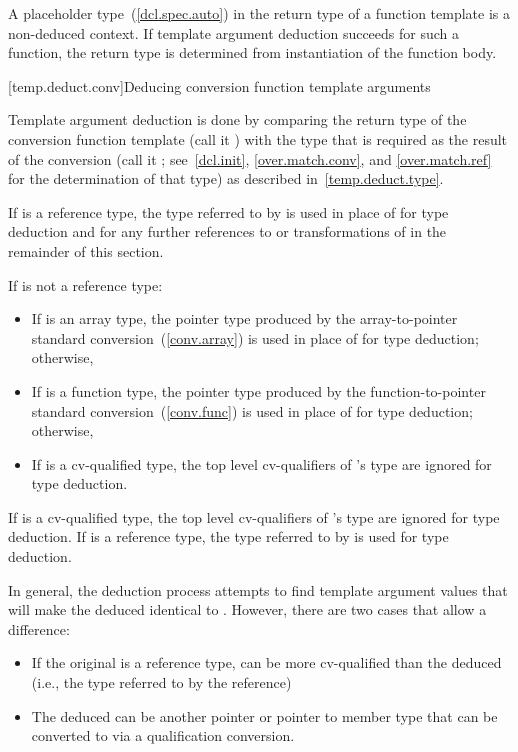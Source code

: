 \pnum
A placeholder type~(\ref{dcl.spec.auto}) in the return type of a
function template is a non-deduced context. If template argument
deduction succeeds for such a function, the return type is determined
from instantiation of the function body.

[temp.deduct.conv]{Deducing conversion function template arguments}

\pnum
Template argument deduction is done by comparing the return type of
the
conversion function template
(call it
)
with the type that is
required as the result of the conversion (call it
; see~\ref{dcl.init}, \ref{over.match.conv}, and \ref{over.match.ref}
for the determination of that type)
as described in~\ref{temp.deduct.type}.

\pnum
If  is a reference type, the type referred to by  is used in place
of  for type deduction and for any further references to or transformations of
 in the remainder of this section.

\pnum
If
is not a reference type:

\begin{itemize}
\item
If
is an array type, the pointer type produced by the
array-to-pointer standard conversion~(\ref{conv.array}) is used in place of
for type
deduction; otherwise,
\item
If
is a function type, the pointer type produced by the
function-to-pointer standard conversion~(\ref{conv.func}) is used in place of
for
type deduction; otherwise,
\item
If
is a cv-qualified type, the top level cv-qualifiers of
's
type are ignored for type deduction.
\end{itemize}

\pnum
If
is a cv-qualified type, the top level cv-qualifiers of
's
type are ignored for type deduction.
If
is a
reference type, the type referred to by
is used for type deduction.

\pnum
In general, the deduction process attempts to find template argument
values that will make the deduced
identical to
.
However, there are two cases that allow a difference:

\begin{itemize}
\item
If the original
is a reference type,
can be more cv-qualified
than the deduced
(i.e., the type referred to by the reference)
\item
The deduced
can be another pointer or pointer to member type that
can be converted to
via a qualification conversion.
\end{itemize}

